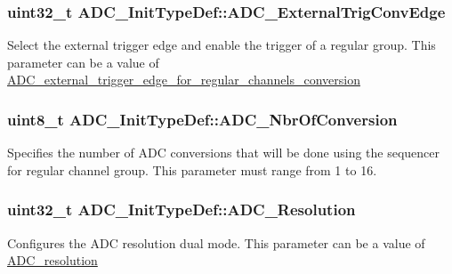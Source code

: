 \subsubsection[{\texorpdfstring{A\+D\+C\+\_\+\+External\+Trig\+Conv\+Edge}{ADC_ExternalTrigConvEdge}}]{\setlength{\rightskip}{0pt plus 5cm}uint32\+\_\+t A\+D\+C\+\_\+\+Init\+Type\+Def\+::\+A\+D\+C\+\_\+\+External\+Trig\+Conv\+Edge}\hypertarget{struct_a_d_c___init_type_def_abe372c73942aef47016be85ca1b79650}{}\label{struct_a_d_c___init_type_def_abe372c73942aef47016be85ca1b79650}
Select the external trigger edge and enable the trigger of a regular group. This parameter can be a value of \hyperlink{group___a_d_c__external__trigger__edge__for__regular__channels__conversion}{A\+D\+C\+\_\+external\+\_\+trigger\+\_\+edge\+\_\+for\+\_\+regular\+\_\+channels\+\_\+conversion} 
\subsubsection[{\texorpdfstring{A\+D\+C\+\_\+\+Nbr\+Of\+Conversion}{ADC_NbrOfConversion}}]{\setlength{\rightskip}{0pt plus 5cm}uint8\+\_\+t A\+D\+C\+\_\+\+Init\+Type\+Def\+::\+A\+D\+C\+\_\+\+Nbr\+Of\+Conversion}\hypertarget{struct_a_d_c___init_type_def_a4a508c4bed196dcd50ba03b49c78f460}{}\label{struct_a_d_c___init_type_def_a4a508c4bed196dcd50ba03b49c78f460}
Specifies the number of A\+DC conversions that will be done using the sequencer for regular channel group. This parameter must range from 1 to 16. 
\subsubsection[{\texorpdfstring{A\+D\+C\+\_\+\+Resolution}{ADC_Resolution}}]{\setlength{\rightskip}{0pt plus 5cm}uint32\+\_\+t A\+D\+C\+\_\+\+Init\+Type\+Def\+::\+A\+D\+C\+\_\+\+Resolution}\hypertarget{struct_a_d_c___init_type_def_a275d9553bbe17a60d618b619678b7c94}{}\label{struct_a_d_c___init_type_def_a275d9553bbe17a60d618b619678b7c94}
Configures the A\+DC resolution dual mode. This parameter can be a value of \hyperlink{group___a_d_c__resolution}{A\+D\+C\+\_\+resolution} 
